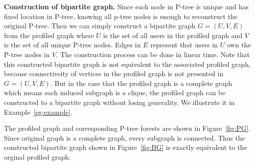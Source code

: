 {\bf Construction of bipartite graph.}
Since each node in P-tree is unique and has fixed location in P-tree, knowing all p-tree nodes is enough to reconstruct the original P-tree. Then we can simply construct a bipartite graph $G=(U,V,E)$ from the profiled graph where $U$ is the set of all users in the profiled graph and $V$ is the set of all unique P-tree nodes. Edges in $E$ represent that users in $U$ own the P-tree nodes in $V$. The construction process can be done in linear time. Note that this constructed bipartite graph is not equivalent to the associated profiled graph, because connectiveity of vertices in the profiled graph is not presented in $G=(U,V,E)$. But in the case that the profiled graph is a complete graph which means each induced subgraph is a clique, the profiled graph can be constructed to a bipartite graph without losing generality. We illustrute it in Example~\ref{eg:example}.

\begin{example}
\label{eg:example}
The profiled graph and corresponding P-tree forests are shown in Figure~\ref{fig:PG}. Since original graph is a complete graph, every subgraph is connected. Thus the constructed bipartite graph shown in Figure~\ref{fig:BG} is exactly equivalent to the orginal profiled graph.
\end{example}

